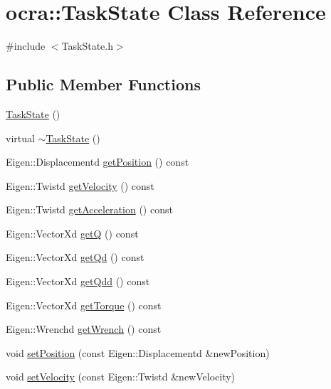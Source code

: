 \hypertarget{classocra_1_1TaskState}{}\section{ocra\+:\+:Task\+State Class Reference}
\label{classocra_1_1TaskState}


{\ttfamily \#include $<$Task\+State.\+h$>$}

\subsection*{Public Member Functions}
\begin{DoxyCompactItemize}
\item 
\hyperlink{classocra_1_1TaskState_ac1f837e41fe77702983ca2931eb7335f}{Task\+State} ()
\item 
virtual \hyperlink{classocra_1_1TaskState_af41cac3e2be634b88815fde36a75434f}{$\sim$\+Task\+State} ()
\item 
Eigen\+::\+Displacementd \hyperlink{classocra_1_1TaskState_abe2716c00d5867a596dd64ce74ee1296}{get\+Position} () const 
\item 
Eigen\+::\+Twistd \hyperlink{classocra_1_1TaskState_a3c435a0890d7ceee3d9db780f6b986cf}{get\+Velocity} () const 
\item 
Eigen\+::\+Twistd \hyperlink{classocra_1_1TaskState_ab66b183e1dc3b5623190bf72e5df5c20}{get\+Acceleration} () const 
\item 
Eigen\+::\+Vector\+Xd \hyperlink{classocra_1_1TaskState_a2342d444b58fda56fef4ae7cb08f8e22}{getQ} () const 
\item 
Eigen\+::\+Vector\+Xd \hyperlink{classocra_1_1TaskState_abbc0755f42e117f71a93e3a88113bed6}{get\+Qd} () const 
\item 
Eigen\+::\+Vector\+Xd \hyperlink{classocra_1_1TaskState_a89a6fdbcb7c1686bc4c3c1888ab7a871}{get\+Qdd} () const 
\item 
Eigen\+::\+Vector\+Xd \hyperlink{classocra_1_1TaskState_a5c0d512db808774c00361c3ee1e782ac}{get\+Torque} () const 
\item 
Eigen\+::\+Wrenchd \hyperlink{classocra_1_1TaskState_af6c401a9434a3896c4c0d9bed136294c}{get\+Wrench} () const 
\item 
void \hyperlink{classocra_1_1TaskState_a4107e9ca574e2baa40add4d993d3c01f}{set\+Position} (const Eigen\+::\+Displacementd \&new\+Position)
\item 
void \hyperlink{classocra_1_1TaskState_ab689ec0b7ba14557f5f475f1feba22b0}{set\+Velocity} (const Eigen\+::\+Twistd \&new\+Velocity)

\end{DoxyCompactItemize}
